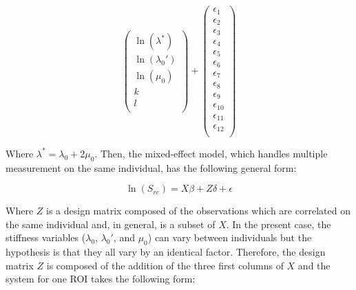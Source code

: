 \documentclass[a4paper,fleqn]{DC_ArtStyle}
\begin{document}
\begin{equation}
\begin{pmatrix}
		\ln(\lambda^{*}) \\
		\ln(\lambda_0') \\
		\ln(\mu_0) \\
		k \\
		l \\
	\end{pmatrix} + \begin{pmatrix}
		\epsilon_{1} \\
		\epsilon_{2} \\
		\epsilon_{3} \\
		\epsilon_{4} \\
		\epsilon_{5} \\
		\epsilon_{6} \\
		\epsilon_{7} \\
		\epsilon_{8} \\
		\epsilon_{9} \\
		\epsilon_{10} \\
		\epsilon_{11} \\
		\epsilon_{12} \\
	\end{pmatrix}
\end{equation}

Where $\lambda^{*} = \lambda_0 + 2\mu_0$. Then, the mixed-effect model, which handles multiple measurement on the same individual, has the following general form:

\begin{equation}
	\ln(S_{rc}) = X \beta + Z \delta + \epsilon
\end{equation}

Where $Z$ is a design matrix composed of the observations which are correlated on the same individual and, in general, is a subset of $X$. In the present case, the stiffness variables ($\lambda_0$, $\lambda_0'$, and $\mu_0$) can vary between individuals but the hypothesis is that they all vary by an identical factor. Therefore, the design matrix $Z$ is composed of the addition of the three first columns of $X$ and the system for one ROI takes the following form:\\
\end{document}
